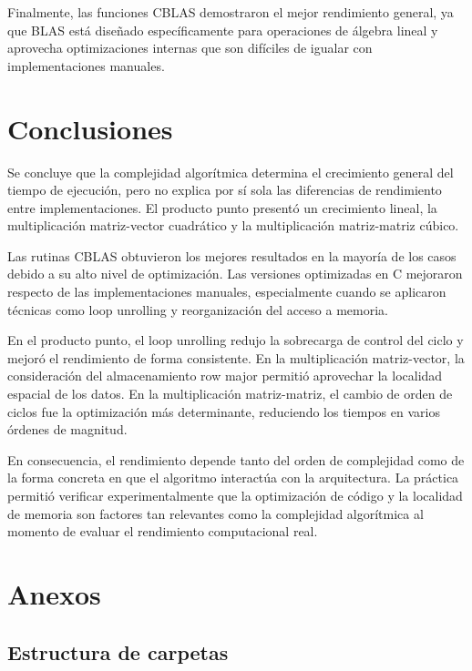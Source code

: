 \documentclass[12pt,letterpaper]{article}
\begin{document}
Finalmente, las funciones CBLAS demostraron el mejor rendimiento general, ya que BLAS está diseñado específicamente para operaciones de álgebra lineal y aprovecha optimizaciones internas que son difíciles de igualar con implementaciones manuales.

\section{Conclusiones}

Se concluye que la complejidad algorítmica determina el crecimiento general del tiempo de ejecución, pero no explica por sí sola las diferencias de rendimiento entre implementaciones. El producto punto presentó un crecimiento lineal, la multiplicación matriz-vector cuadrático y la multiplicación matriz-matriz cúbico.

Las rutinas CBLAS obtuvieron los mejores resultados en la mayoría de los casos debido a su alto nivel de optimización. Las versiones optimizadas en C mejoraron respecto de las implementaciones manuales, especialmente cuando se aplicaron técnicas como loop unrolling y reorganización del acceso a memoria.

En el producto punto, el loop unrolling redujo la sobrecarga de control del ciclo y mejoró el rendimiento de forma consistente. En la multiplicación matriz-vector, la consideración del almacenamiento row major permitió aprovechar la localidad espacial de los datos. En la multiplicación matriz-matriz, el cambio de orden de ciclos fue la optimización más determinante, reduciendo los tiempos en varios órdenes de magnitud.

En consecuencia, el rendimiento depende tanto del orden de complejidad como de la forma concreta en que el algoritmo interactúa con la arquitectura. La práctica permitió verificar experimentalmente que la optimización de código y la localidad de memoria son factores tan relevantes como la complejidad algorítmica al momento de evaluar el rendimiento computacional real.

\section{Anexos}

\subsection{Estructura de carpetas}
\end{document}
